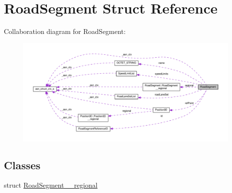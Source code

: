 \hypertarget{structRoadSegment}{}\section{Road\+Segment Struct Reference}
\label{structRoadSegment}


Collaboration diagram for Road\+Segment\+:\nopagebreak
\begin{figure}[H]
\begin{center}
\leavevmode
\includegraphics[width=350pt]{structRoadSegment__coll__graph}
\end{center}
\end{figure}
\subsection*{Classes}
\begin{DoxyCompactItemize}
\item 
struct \hyperlink{structRoadSegment_1_1RoadSegment____regional}{Road\+Segment\+\_\+\+\_\+regional}
\end{DoxyCompactItemize}
